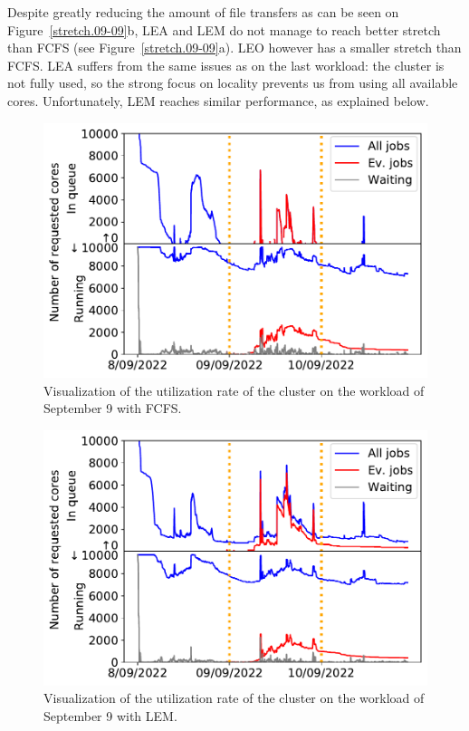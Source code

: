 \documentclass[conference,10pt]{IEEEtran}
\begin{document}
Despite greatly reducing the amount of file transfers as can be seen on Figure~\ref{stretch.09-09}b, LEA and LEM
do not manage to reach better stretch than FCFS (see Figure~\ref{stretch.09-09}a).
LEO however has a smaller stretch than FCFS. 
LEA suffers from the same issues as on the last workload: the cluster is
not fully used, so 
the strong focus on locality  prevents us from using all available cores. Unfortunately, LEM reaches similar performance, as explained below.




\begin{figure}[t]\centering\includegraphics[width=0.9\linewidth]{../MBSS/plot/Cluster_usage/2022-09-09->2022-09-09_V10000_Fcfs_Used_nodes_Reduced_450_128_32_256_4_1024_core_by_core.pdf}\caption{Visualization of the utilization rate of the cluster on the workload of September 9 with FCFS.}\label{cluster_09-09_fcfs}\end{figure}
\begin{figure}[t]\centering\includegraphics[width=0.9\linewidth]{../MBSS/plot/Cluster_usage/2022-09-09->2022-09-09_V10000_Fcfs_with_a_score_mixed_strategy_x500_x1_x0_x0_Used_nodes_Reduced_450_128_32_256_4_1024_core_by_core.pdf}\caption{Visualization of the utilization rate of the cluster on the workload of September 9 with LEM.}\label{cluster_09-09_lem}
\end{figure}
\end{document}
